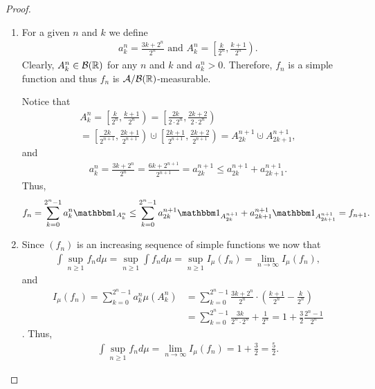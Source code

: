 \begin{proof}$ $\newline
	\begin{enumerate}
		\item For a given $n$ and $k$ we define
		\begin{align*}
			a^n_k = \frac{3k + 2^n}{2^n}\text{ and } A^n_k = \left[\frac{k}{2^n}, \frac{k+1}{2^n}\right).
		\end{align*}
		Clearly, $A^n_k \in \mathcal{B}(\mathbb{R})$ for any $n$ and $k$ and $a^n_k > 0$. Therefore, $f_n$ is a simple function and thus $f_n$ is $\mathcal{A}/\mathcal{B}(\mathbb{R})$-measurable.
		
		Notice that
		\begin{multline*}
			A_k^n = \left[\frac{k}{2^n}, \frac{k+1}{2^n}\right)
			= \left[\frac{2k}{2\cdot 2^n}, \frac{2k+2}{2\cdot 2^n}\right)\\
			= \left[\frac{2k}{2^{n+1}}, \frac{2k+1}{2^{n+1}}\right) \cupdot \left[\frac{2k+1}{2^{n+1}}, \frac{2k+2}{2^{n+1}}\right) = A_{2k}^{n+1} \cupdot A_{2k+1}^{n+1},
		\end{multline*}
		and
		\begin{align*}
			a_k^n = \frac{3k + 2^n}{2^n} = \frac{6k + 2^{n+1}}{2^{n+1}} = a_{2k}^{n+1} \leq a_{2k}^{n+1} + a_{2k+1}^{n+1}.
		\end{align*}
		Thus,
		\begin{align*}
			f_n = \sum_{k = 0}^{2^n - 1} a_k^n \ind_{A_k^n} \leq \sum_{k = 0}^{2^n - 1} a_{2k}^{n+1} \ind_{A_{2k}^{n+1}} + a_{2k+1}^{n+1} \ind_{A_{2k+1}^{n+1}} = f_{n+1}.
		\end{align*}
		
		\item Since $(f_n)$ is an increasing sequence of simple functions we now that
		\begin{align*}
			\int \sup_{n \geq 1} f_n d\mu = \sup_{n \geq 1} \int f_n d\mu = \sup_{n \geq 1} I_\mu(f_n) = \lim_{n \to \infty} I_\mu(f_n),
		\end{align*}
		and
		\begin{align*}
			I_\mu(f_n) = \sum_{k=0}^{2^n - 1} a_k^n \mu(A_k^n)
			&= \sum_{k = 0}^{2^n - 1} \frac{3k + 2^n}{2^n} \cdot \left(\frac{k+1}{2^n} - \frac{k}{2^n}\right)\\
			&= \sum_{k = 0}^{2^n - 1} \frac{3k}{2^n \cdot 2^n} + \frac{1}{2^n} = 1 + \frac{3}{2} \frac{2^n - 1}{2^n}
		\end{align*}.
		Thus,
		\begin{align*}
			\int \sup_{n \geq 1} f_n d \mu = \lim_{n \to \infty} I_\mu(f_n) = 1 + \frac{3}{2} = \frac{5}{2}.
		\end{align*}
	\end{enumerate}
\end{proof}

